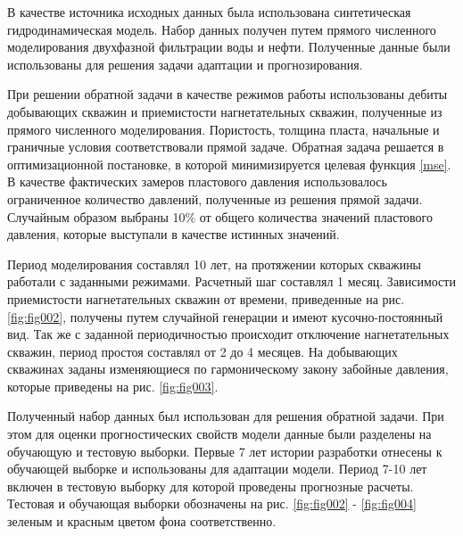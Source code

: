 \documentclass{article}
\begin{document}
В качестве источника исходных данных была использована синтетическая гидродинамическая модель. Набор данных получен путем прямого численного моделирования двухфазной фильтрации воды и нефти. Полученные данные были использованы для решения задачи адаптации и прогнозирования.

При решении обратной задачи в качестве режимов работы использованы дебиты добывающих скважин и приемистости нагнетательных скважин, полученные из прямого численного моделирования. Пористость, толщина пласта, начальные и граничные условия соответствовали прямой задаче. Обратная задача решается в оптимизационной постановке, в которой минимизируется целевая функция {\ref{mse}}. В качестве фактических замеров пластового давления использовалось ограниченное количество давлений, полученные из решения прямой задачи. Случайным образом выбраны 10\% от общего количества значений пластового давления, которые выступали в качестве истинных значений.

Период моделирования составлял 10 лет, на протяжении которых скважины работали с заданными режимами. Расчетный шаг составлял 1 месяц. Зависимости приемистости нагнетательных скважин от времени, приведенные на рис. \ref{fig:fig002}, получены путем случайной генерации и имеют кусочно-постоянный вид. Так же с заданной периодичностью происходит отключение нагнетательных скважин, период простоя составлял от 2 до 4 месяцев. На добывающих скважинах заданы изменяющиеся по гармоническому закону забойные давления, которые приведены на рис. \ref{fig:fig003}.

Полученный набор данных был использован для решения обратной задачи. При этом для оценки прогностических свойств модели данные были разделены на обучающую и тестовую выборки. Первые 7 лет истории разработки отнесены к обучающей выборке и использованы для адаптации модели. Период 7-10 лет включен в тестовую выборку для которой проведены прогнозные расчеты. Тестовая и обучающая выборки обозначены на рис. \ref{fig:fig002} - \ref{fig:fig004} зеленым и красным цветом фона соответственно.
\end{document}
